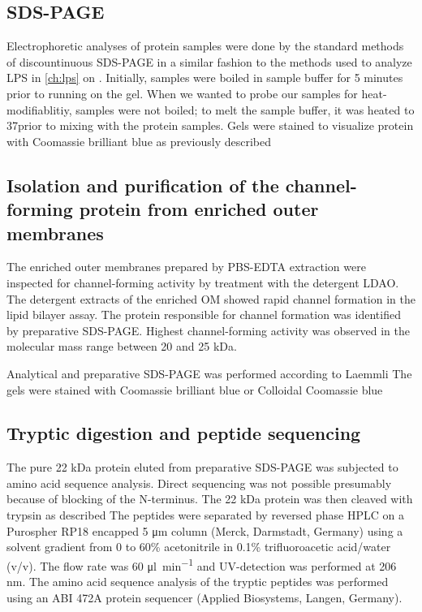 \subsection{\ac{SDS-PAGE}} \label{sec:porin-sds-page}
Electrophoretic analyses of protein samples were done by the standard methods of discountinuous \ac{SDS-PAGE} in a similar fashion to the methods used to analyze \ac{LPS} in \cref{ch:lps} on . Initially, samples were boiled in sample buffer for 5 minutes prior to running on the gel. When we wanted to probe our samples for heat-modifiablitiy, samples were not boiled; to melt the sample buffer, it was heated to 37\cel prior to mixing with the protein samples. Gels were stained to visualize protein with Coomassie brilliant blue as previously described

\subsection{Isolation and purification of the channel-forming protein from enriched outer membranes}
\label{sub:porin_isolation}
The enriched outer membranes prepared by \ac{PBS}-\ac{EDTA} extraction were inspected for channel-forming activity by treatment with the detergent \ac{LDAO}. The detergent extracts of the enriched OM showed rapid channel formation in the lipid bilayer assay. The protein responsible for channel formation was identified by preparative \ac{SDS-PAGE}. Highest channel-forming activity was observed in the molecular mass range between 20 and 25 kDa.

Analytical and preparative \ac{SDS-PAGE} was performed according to Laemmli The gels were stained with Coomassie brilliant blue or Colloidal Coomassie blue 

\subsection{Tryptic digestion and peptide sequencing}
\label{sub:porin_tryptic}
The pure 22 kDa protein eluted from preparative \ac{SDS-PAGE} was subjected to amino acid sequence analysis. Direct sequencing was not possible presumably because of blocking of the N-terminus. The 22 kDa protein was then cleaved with trypsin as described The peptides were separated by reversed phase HPLC on a Purospher RP18 encapped 5 \si{\micro\metre} column (Merck, Darmstadt, Germany) using a solvent gradient from 0 to 60\% acetonitrile in 0.1\% trifluoroacetic acid/water (v/v). The flow rate was 60 \si{\micro\litre\per\minute} and UV-detection was performed at 206 \si{\nano\metre}. The amino acid sequence analysis of the tryptic peptides was performed using an ABI 472A protein sequencer (Applied Biosystems, Langen, Germany).

